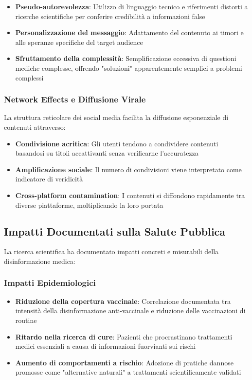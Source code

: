\documentclass[12pt,a4paper]{report}
\begin{document}
\begin{itemize}
    \item \textbf{Pseudo-autorevolezza}: Utilizzo di linguaggio tecnico e riferimenti distorti a ricerche scientifiche per conferire credibilità a informazioni false
    \item \textbf{Personalizzazione del messaggio}: Adattamento del contenuto ai timori e alle speranze specifiche del target audience
    \item \textbf{Sfruttamento della complessità}: Semplificazione eccessiva di questioni mediche complesse, offrendo "soluzioni" apparentemente semplici a problemi complessi
\end{itemize}

\subsubsection{Network Effects e Diffusione Virale}

La struttura reticolare dei social media facilita la diffusione esponenziale di contenuti attraverso:

\begin{itemize}
    \item \textbf{Condivisione acritica}: Gli utenti tendono a condividere contenuti basandosi su titoli accattivanti senza verificarne l'accuratezza
    \item \textbf{Amplificazione sociale}: Il numero di condivisioni viene interpretato come indicatore di veridicità
    \item \textbf{Cross-platform contamination}: I contenuti si diffondono rapidamente tra diverse piattaforme, moltiplicando la loro portata
\end{itemize}

\subsection{Impatti Documentati sulla Salute Pubblica}

La ricerca scientifica ha documentato impatti concreti e misurabili della disinformazione medica:

\subsubsection{Impatti Epidemiologici}

\begin{itemize}
    \item \textbf{Riduzione della copertura vaccinale}: Correlazione documentata tra intensità della disinformazione anti-vaccinale e riduzione delle vaccinazioni di routine
    \item \textbf{Ritardo nella ricerca di cure}: Pazienti che procrastinano trattamenti medici essenziali a causa di informazioni fuorvianti sui rischi
    \item \textbf{Aumento di comportamenti a rischio}: Adozione di pratiche dannose promosse come "alternative naturali" a trattamenti scientificamente validati
\end{itemize}
\end{document}
